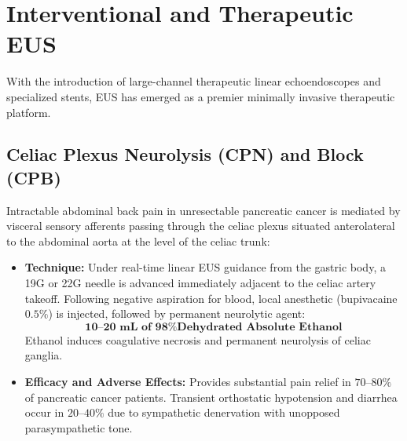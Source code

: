 \documentclass[11pt,a4paper]{article}
\begin{document}
\section{Interventional and Therapeutic EUS}
With the introduction of large-channel therapeutic linear echoendoscopes and specialized stents, EUS has emerged as a premier minimally invasive therapeutic platform.

\subsection{Celiac Plexus Neurolysis (CPN) and Block (CPB)}
Intractable abdominal back pain in unresectable pancreatic cancer is mediated by visceral sensory afferents passing through the celiac plexus situated anterolateral to the abdominal aorta at the level of the celiac trunk:
\begin{itemize}[leftmargin=2em]
    \item \textbf{Technique:} Under real-time linear EUS guidance from the gastric body, a 19G or 22G needle is advanced immediately adjacent to the celiac artery takeoff. Following negative aspiration for blood, local anesthetic (bupivacaine $0.5\%$) is injected, followed by permanent neurolytic agent:
    \begin{equation}
        \mathbf{10\text{--}20\text{ mL of 98\% Dehydrated Absolute Ethanol}}
    \end{equation}
    Ethanol induces coagulative necrosis and permanent neurolysis of celiac ganglia.
    \item \textbf{Efficacy and Adverse Effects:} Provides substantial pain relief in $70\text{--}80\%$ of pancreatic cancer patients. Transient orthostatic hypotension and diarrhea occur in $20\text{--}40\%$ due to sympathetic denervation with unopposed parasympathetic tone.
\end{itemize}
\end{document}
